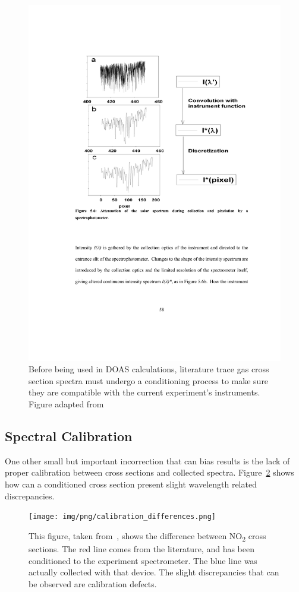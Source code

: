 \begin{figure}[htpb]
    \centering
    \includegraphics[clip,%
    trim=3cm 13.1cm 3cm 3cm,%
    width=.8\textwidth]{img/pdf/beekman_conditioning.pdf}
    \caption{Before being used in \gls{DOAS} calculations, literature
    trace gas cross section spectra must undergo a conditioning process
    to make sure they are compatible with the current experiment's
    instruments. Figure adapted from~\cite{Beekman2010}}
    \label{fig:cross_section_conditioning}
\end{figure}

\subsection{Spectral Calibration}%
\label{sub:spectral_calibration}

One other small but important incorrection that can bias results is the
lack of proper calibration between cross sections and collected spectra.
Figure~\ref{fig:conditioned_cross_section_discrepancy} shows how can a
conditioned cross section present slight wavelength related
discrepancies.

\begin{figure}[htpb]
    \centering
    \texttt{[image: img/png/calibration\_differences.png]}
    \caption{This figure, taken from~\cite{Beekman2010}, shows the difference
    between NO\textsubscript{2} cross sections. The red line comes from
    the literature, and has been conditioned to the experiment spectrometer.
    The blue line was actually collected with that device. The slight
    discrepancies that can be observed are calibration defects.}
    \label{fig:conditioned_cross_section_discrepancy}
\end{figure}

